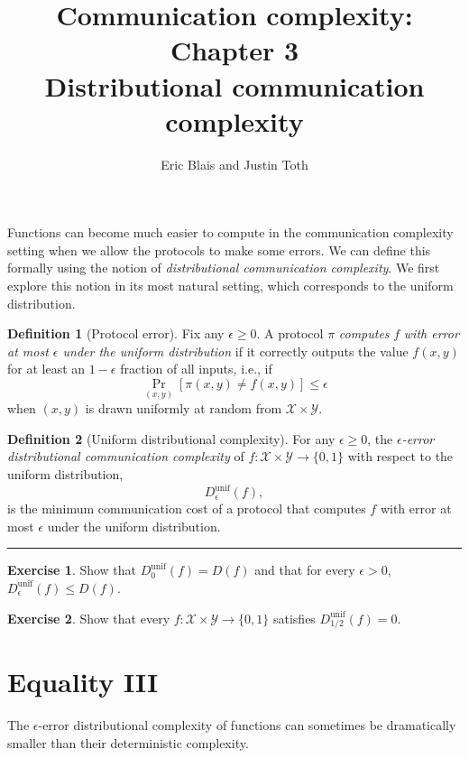 \documentclass[11pt]{amsart}
\title{Communication complexity: Chapter 3 \\ Distributional communication complexity}
\author{Eric Blais and Justin Toth}
\theoremstyle{plain}
\theoremstyle{definition}
\newtheorem{definition}{Definition}
\newtheorem{exercise}{Exercise}
\theoremstyle{plain}
\newcommand{\calX}{\mathcal{X}}
\newcommand{\calY}{\mathcal{Y}}
\newcommand{\exercises}{\bigskip \noindent\rule{8cm}{0.4pt} \medskip}
\begin{document}
\maketitle


Functions can become much easier to compute in the communication complexity setting when we allow the protocols to make some errors. We can define this formally using the notion of \emph{distributional communication complexity}. We first explore this notion in its most natural setting, which corresponds to the uniform distribution.

\begin{definition}[Protocol error]
Fix any $\epsilon \ge 0$. A protocol $\pi$ \emph{computes} $f$ \emph{with error at most $\epsilon$ under the uniform distribution} if it correctly outputs the value $f(x,y)$ for at least an $1-\epsilon$ fraction of all inputs, i.e., if
\[
\Pr_{(x,y)}[ \pi(x,y) \neq f(x,y)] \le \epsilon
\]
when $(x,y)$ is drawn uniformly at random from $\calX \times \calY$.
\end{definition}

\begin{definition}[Uniform distributional complexity]
For any $\epsilon \ge 0$, the \emph{$\epsilon$-error distributional communication complexity} of $f : \mathcal{X} \times \mathcal{Y} \to \{0,1\}$ with respect to the uniform distribution,
\[
D_\epsilon^{\mathrm{unif}}(f),
\]
is the minimum communication cost of a protocol that computes $f$ with error at most $\epsilon$ under the uniform distribution.
\end{definition}

\exercises

\begin{exercise}
Show that $D_0^{\mathrm{unif}}(f) = D(f)$ and that for every $\epsilon > 0$, 
$D_\epsilon^{\mathrm{unif}}(f) \le D(f)$.
\end{exercise}

\begin{exercise}
Show that every $f : \mathcal{X} \times \mathcal{Y} \to \{0,1\}$ satisfies
$D_{1/2}^{\mathrm{unif}}(f) = 0$.
\end{exercise}


\newpage \section{Equality III}

The $\epsilon$-error distributional complexity of functions can sometimes be dramatically smaller than their deterministic complexity.
\end{document}
